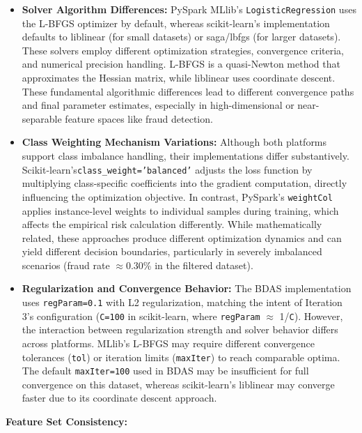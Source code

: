 \documentclass[sigplan,screen]{acmart}
\begin{document}
\begin{itemize}
\item \textbf{Solver Algorithm Differences:} PySpark MLlib's \texttt{Logistic\allowbreak Regression} uses the L-BFGS optimizer by default, whereas scikit-learn's implementation defaults to liblinear (for small datasets) or saga/lbfgs (for larger datasets). These solvers employ different optimization strategies, convergence criteria, and numerical precision handling. L-BFGS is a quasi-Newton method that approximates the Hessian matrix, while liblinear uses coordinate descent. These fundamental algorithmic differences lead to different convergence paths and final parameter estimates, especially in high-dimensional or near-separable feature spaces like fraud detection.

\item \textbf{Class Weighting Mechanism Variations:} Although both platforms support class imbalance handling, their implementations differ substantively. Scikit-learn's\newline\texttt{class\_\allowbreak weight=\allowbreak 'balanced'} adjusts the loss function by multiplying class-specific coefficients into the gradient computation, directly influencing the optimization objective. In contrast, PySpark's \texttt{weightCol} applies instance-level weights to individual samples during training, which affects the empirical risk calculation differently. While mathematically related, these approaches produce different optimization dynamics and can yield different decision boundaries, particularly in severely imbalanced scenarios (fraud rate $\approx$0.30\% in the filtered dataset).

\item \textbf{Regularization and Convergence Behavior:} The BDAS implementation uses \texttt{regParam=0.1} with L2 regularization, matching the intent of Iteration 3's configuration (\texttt{C=100} in scikit-learn, where \texttt{regParam} $\approx$ 1/\texttt{C}). However, the interaction between regularization strength and solver behavior differs across platforms. MLlib's L-BFGS may require different convergence tolerances (\texttt{tol}) or iteration limits (\texttt{maxIter}) to reach comparable optima. The default \texttt{maxIter=100} used in BDAS may be insufficient for full convergence on this dataset, whereas scikit-learn's liblinear may converge faster due to its coordinate descent approach.
\end{itemize}

\textbf{Feature Set Consistency:}
\end{document}
